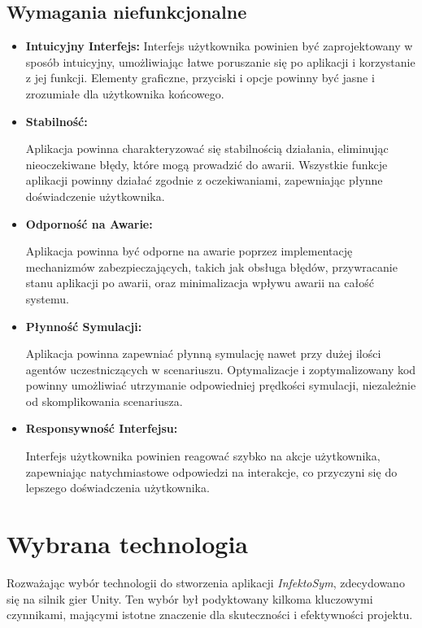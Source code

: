 \subsection{\textbf{Wymagania niefunkcjonalne}}
\begin{itemize}
	\item   \textbf{  Intuicyjny Interfejs:}
	Interfejs użytkownika powinien być zaprojektowany w sposób intuicyjny, umożliwiając łatwe poruszanie się po aplikacji i korzystanie z jej funkcji. Elementy graficzne, przyciski i opcje powinny być jasne i zrozumiałe dla użytkownika końcowego.
	\item\textbf{ Stabilność:}
	
	Aplikacja powinna charakteryzować się stabilnością działania, eliminując nieoczekiwane błędy, które mogą prowadzić do awarii. Wszystkie funkcje aplikacji powinny działać zgodnie z oczekiwaniami, zapewniając płynne doświadczenie użytkownika.
	\item\textbf{ Odporność na Awarie:}
	
	Aplikacja powinna być odporne na awarie poprzez implementację mechanizmów zabezpieczających, takich jak obsługa błędów, przywracanie stanu aplikacji po awarii, oraz minimalizacja wpływu awarii na całość systemu.
	
	\item \textbf{Płynność Symulacji:}
	
	Aplikacja powinna zapewniać płynną symulację nawet przy dużej ilości agentów uczestniczących w scenariuszu. Optymalizacje i zoptymalizowany kod powinny umożliwiać utrzymanie odpowiedniej prędkości symulacji, niezależnie od skomplikowania scenariusza.
	
	\item\textbf{ Responsywność Interfejsu:}
	
	Interfejs użytkownika powinien reagować szybko na akcje użytkownika, zapewniając natychmiastowe odpowiedzi na interakcje, co przyczyni się do lepszego doświadczenia użytkownika.
\end{itemize}
\section{\textbf{Wybrana technologia}}

Rozważając wybór technologii do stworzenia aplikacji \textit{InfektoSym}, zdecydowano się na silnik gier Unity. Ten wybór był podyktowany kilkoma kluczowymi czynnikami, mającymi istotne znaczenie dla skuteczności i efektywności projektu.

